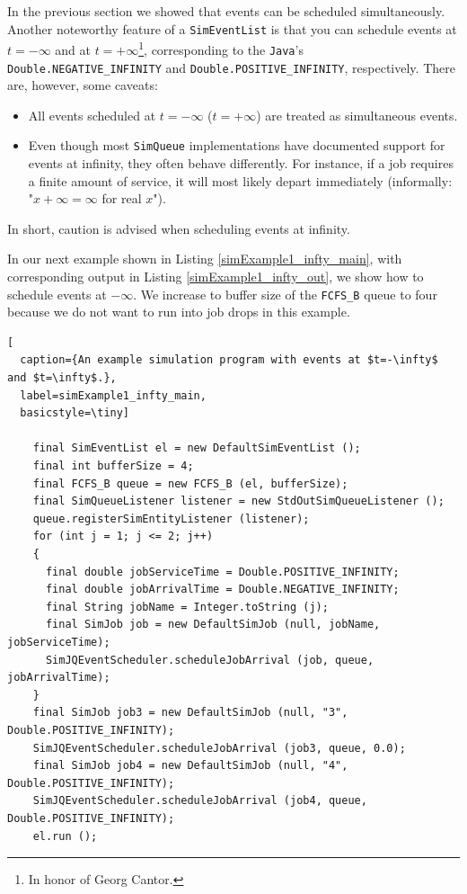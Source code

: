 \documentclass[12pt]{book}
\begin{document}
In the previous section we showed that
  events can be scheduled simultaneously.
Another noteworthy feature of a \lstinline|SimEventList|
  is that you can schedule events
  at $t=-\infty$ and at $t=+\infty$\footnote{
In honor of Georg Cantor.},
  corresponding to the \lstinline|Java|'s
  \lstinline|Double.NEGATIVE_INFINITY| and
  \lstinline|Double.POSITIVE_INFINITY|,
  respectively.
There are, however, some caveats:
\begin{itemize}
  \item All events scheduled at $t=-\infty$ ($t=+\infty$)
          are treated as simultaneous events.
  \item Even though most \lstinline|SimQueue|
          implementations have documented support
          for events at infinity,
          they often behave differently.
        For instance, if a job requires
          a finite amount of service,
          it will most likely depart immediately
          (informally: "$x + \infty = \infty$ for real $x$").
\end{itemize}
In short, caution is advised when scheduling events at infinity.

In our next example shown in Listing \ref{simExample1_infty_main},
  with corresponding output in Listing \ref{simExample1_infty_out},
  we show how to schedule events at $-\infty$.
We increase to buffer size of the \lstinline|FCFS_B| queue to four
  because we do not want to run into job drops in this example.
  
\begin{lstfloat}
\begin{lstlisting}[
  caption={An example simulation program with events at $t=-\infty$ and $t=\infty$.},
  label=simExample1_infty_main,
  basicstyle=\tiny]

    final SimEventList el = new DefaultSimEventList ();
    final int bufferSize = 4;
    final FCFS_B queue = new FCFS_B (el, bufferSize);
    final SimQueueListener listener = new StdOutSimQueueListener ();
    queue.registerSimEntityListener (listener);
    for (int j = 1; j <= 2; j++)
    {
      final double jobServiceTime = Double.POSITIVE_INFINITY;
      final double jobArrivalTime = Double.NEGATIVE_INFINITY;
      final String jobName = Integer.toString (j);
      final SimJob job = new DefaultSimJob (null, jobName, jobServiceTime);
      SimJQEventScheduler.scheduleJobArrival (job, queue, jobArrivalTime);
    }
    final SimJob job3 = new DefaultSimJob (null, "3", Double.POSITIVE_INFINITY);
    SimJQEventScheduler.scheduleJobArrival (job3, queue, 0.0);
    final SimJob job4 = new DefaultSimJob (null, "4", Double.POSITIVE_INFINITY);
    SimJQEventScheduler.scheduleJobArrival (job4, queue, Double.POSITIVE_INFINITY);
    el.run ();

\end{lstlisting}
\end{lstfloat}
\end{document}
